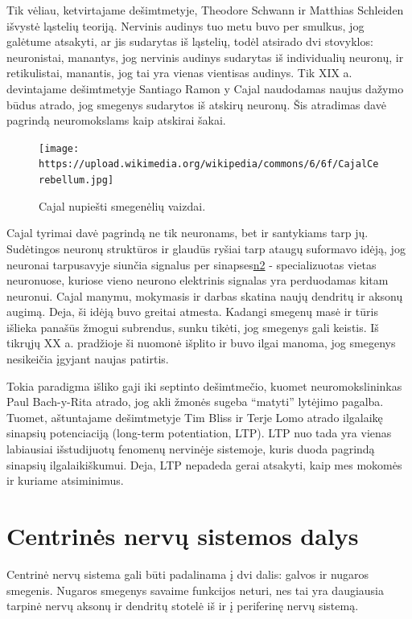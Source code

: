 \documentclass[]{book}
\begin{document}
Tik vėliau, ketvirtajame dešimtmetyje, Theodore Schwann ir Matthias Schleiden išvystė ląstelių teoriją. Nervinis audinys tuo metu buvo per smulkus, jog galėtume atsakyti, ar jis sudarytas iš ląstelių, todėl atsirado dvi stovyklos: neuronistai, manantys, jog nervinis audinys sudarytas iš individualių neuronų, ir retikulistai, manantis, jog tai yra vienas vientisas audinys. Tik XIX a. devintajame dešimtmetyje Santiago Ramon y Cajal naudodamas naujus dažymo būdus atrado, jog smegenys sudarytos iš atskirų neuronų. Šis atradimas davė pagrindą neuromokslams kaip atskirai šakai.

\begin{figure}
\centering
\texttt{[image: https://upload.wikimedia.org/wikipedia/commons/6/6f/CajalCerebellum.jpg]}
\caption{Cajal nupiešti smegenėlių vaizdai.}
\end{figure}

Cajal tyrimai davė pagrindą ne tik neuronams, bet ir santykiams tarp jų. Sudėtingos neuronų struktūros ir glaudūs ryšiai tarp ataugų suformavo idėją, jog neuronai tarpusavyje siunčia signalus per sinapses\href{Terminas\%20sinapsė\%20atsiras\%20tik\%20vėliau,\%201897\%20m.}{n2} - specializuotas vietas neuronuose, kuriose vieno neurono elektrinis signalas yra perduodamas kitam neuronui. Cajal manymu, mokymasis ir darbas skatina naujų dendritų ir aksonų augimą. Deja, ši idėją buvo greitai atmesta. Kadangi smegenų masė ir tūris išlieka panašūs žmogui subrendus, sunku tikėti, jog smegenys gali keistis. Iš tikrųjų XX a. pradžioje ši nuomonė išplito ir buvo ilgai manoma, jog smegenys nesikeičia įgyjant naujas patirtis.

Tokia paradigma išliko gaji iki septinto dešimtmečio, kuomet neuromokslininkas Paul Bach-y-Rita atrado, jog akli žmonės sugeba ``matyti'' lytėjimo pagalba. Tuomet, aštuntajame dešimtmetyje Tim Bliss ir Terje Lomo atrado ilgalaikę sinapsių potenciaciją (long-term potentiation, LTP). LTP nuo tada yra vienas labiausiai išstudijuotų fenomenų nervinėje sistemoje, kuris duoda pagrindą sinapsių ilgalaikiškumui. Deja, LTP nepadeda gerai atsakyti, kaip mes mokomės ir kuriame atsiminimus.

\hypertarget{centrines-nervu-sistemos-dalys}{%
\section{Centrinės nervų sistemos dalys}\label{centrines-nervu-sistemos-dalys}}

Centrinė nervų sistema gali būti padalinama į dvi dalis: galvos ir nugaros smegenis. Nugaros smegenys savaime funkcijos neturi, nes tai yra daugiausia tarpinė nervų aksonų ir dendritų stotelė iš ir į periferinę nervų sistemą.
\end{document}
